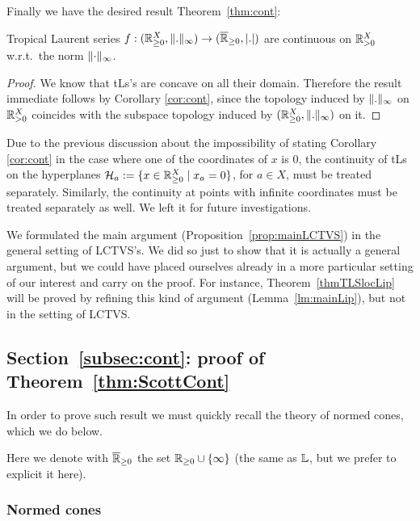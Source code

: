 Finally we have the desired result Theorem~\ref{thm:cont}:

\begin{theorem}
 Tropical Laurent series $f:({\mathbb{R}}_{\geq 0}^X,\lVert.\rVert_\infty) \to (\overline{\mathbb{R}}_{\geq 0},\left\lvert.\right\rvert)$ are continuous on ${\mathbb{R}}_{> 0}^X$ w.r.t.\ the norm $\lVert\cdot\rVert_\infty$.
\end{theorem}
\begin{proof}
 We know that tLs's are concave on all their domain.
 Therefore the result immediate follows by Corollary \ref{cor:cont}, since the topology induced by $\lVert.\rVert_\infty$ on ${\mathbb{R}}_{> 0}^X$ coincides with the subspace topology induced by $({\mathbb{R}}_{\geq 0}^X,\lVert.\rVert_\infty)$ on it.
\end{proof}

Due to the previous discussion about the impossibility of stating Corollary \ref{cor:cont} in the case where one of the coordinates of $x$ is $0$, the continuity of tLs on the hyperplanes $\mathcal H_a:=\{x\in {\mathbb{R}}_{\geq 0}^X \mid x_a=0\}$, for $a\in X$, must be treated separately.
Similarly, the continuity at points with infinite coordinates must be treated separately as well.
We left it for future investigations.

\begin{remark}
 We formulated the main argument (Proposition~\ref{prop:mainLCTVS}) in the general setting of LCTVS's.
We did so just to show that it is actually a general argument, but we could have placed ourselves already in a more particular setting of our interest and carry on the proof.
For instance, Theorem~\ref{thmTLSlocLip} will be proved by refining this kind of argument (Lemma~\ref{lm:mainLip}), but not in the setting of LCTVS.
\end{remark} 



\subsection{Section~\ref{subsec:cont}: proof of Theorem~\ref{thm:ScottCont}}

In order to prove such result we must quickly recall the theory of normed cones, which we do below.

Here we denote with $\overline{\mathbb{R}}_{\geq 0}$ the set $\mathbb{R}_{\geq 0}\cup\{\infty\}$ (the same as $\mathbb{L}$, but we prefer to explicit it here).

\subsubsection{Normed cones}

